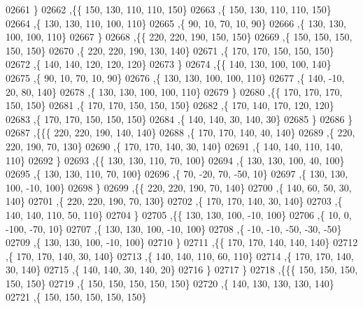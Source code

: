 \begin{DoxyCode}
02661     \}
02662    ,\{\{   150,   130,   110,   110,   150\}
02663     ,\{   150,   130,   110,   110,   150\}
02664     ,\{   130,   130,   110,   100,   110\}
02665     ,\{    90,    10,    70,    10,    90\}
02666     ,\{   130,   130,   100,   100,   110\}
02667     \}
02668    ,\{\{   220,   220,   190,   150,   150\}
02669     ,\{   150,   150,   150,   150,   150\}
02670     ,\{   220,   220,   190,   130,   140\}
02671     ,\{   170,   170,   150,   150,   150\}
02672     ,\{   140,   140,   120,   120,   120\}
02673     \}
02674    ,\{\{   140,   130,   100,   100,   140\}
02675     ,\{    90,    10,    70,    10,    90\}
02676     ,\{   130,   130,   100,   100,   110\}
02677     ,\{   140,   -10,    20,    80,   140\}
02678     ,\{   130,   130,   100,   100,   110\}
02679     \}
02680    ,\{\{   170,   170,   170,   150,   150\}
02681     ,\{   170,   170,   150,   150,   150\}
02682     ,\{   170,   140,   170,   120,   120\}
02683     ,\{   170,   170,   150,   150,   150\}
02684     ,\{   140,   140,    30,   140,    30\}
02685     \}
02686    \}
02687   ,\{\{\{   220,   220,   190,   140,   140\}
02688     ,\{   170,   170,   140,    40,   140\}
02689     ,\{   220,   220,   190,    70,   130\}
02690     ,\{   170,   170,   140,    30,   140\}
02691     ,\{   140,   140,   110,   140,   110\}
02692     \}
02693    ,\{\{   130,   130,   110,    70,   100\}
02694     ,\{   130,   130,   100,    40,   100\}
02695     ,\{   130,   130,   110,    70,   100\}
02696     ,\{    70,   -20,    70,   -50,    10\}
02697     ,\{   130,   130,   100,   -10,   100\}
02698     \}
02699    ,\{\{   220,   220,   190,    70,   140\}
02700     ,\{   140,    60,    50,    30,   140\}
02701     ,\{   220,   220,   190,    70,   130\}
02702     ,\{   170,   170,   140,    30,   140\}
02703     ,\{   140,   140,   110,    50,   110\}
02704     \}
02705    ,\{\{   130,   130,   100,   -10,   100\}
02706     ,\{    10,     0,  -100,   -70,    10\}
02707     ,\{   130,   130,   100,   -10,   100\}
02708     ,\{   -10,   -10,   -50,   -30,   -50\}
02709     ,\{   130,   130,   100,   -10,   100\}
02710     \}
02711    ,\{\{   170,   170,   140,   140,   140\}
02712     ,\{   170,   170,   140,    30,   140\}
02713     ,\{   140,   140,   110,    60,   110\}
02714     ,\{   170,   170,   140,    30,   140\}
02715     ,\{   140,   140,    30,   140,    20\}
02716     \}
02717    \}
02718   ,\{\{\{   150,   150,   150,   150,   150\}
02719     ,\{   150,   150,   150,   150,   150\}
02720     ,\{   140,   130,   130,   130,   140\}
02721     ,\{   150,   150,   150,   150,   150\}

\end{DoxyCode}
